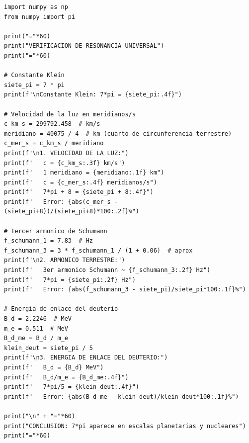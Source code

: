 \begin{lstlisting}[caption={Verificación de Resonancia Universal - Capítulo 12}]
import numpy as np
from numpy import pi

print("="*60)
print("VERIFICACION DE RESONANCIA UNIVERSAL")
print("="*60)

# Constante Klein
siete_pi = 7 * pi
print(f"\nConstante Klein: 7*pi = {siete_pi:.4f}")

# Velocidad de la luz en meridianos/s
c_km_s = 299792.458  # km/s
meridiano = 40075 / 4  # km (cuarto de circunferencia terrestre)
c_mer_s = c_km_s / meridiano
print(f"\n1. VELOCIDAD DE LA LUZ:")
print(f"   c = {c_km_s:.3f} km/s")
print(f"   1 meridiano = {meridiano:.1f} km")
print(f"   c = {c_mer_s:.4f} meridianos/s")
print(f"   7*pi + 8 = {siete_pi + 8:.4f}")
print(f"   Error: {abs(c_mer_s - (siete_pi+8))/(siete_pi+8)*100:.2f}%")

# Tercer armonico de Schumann
f_schumann_1 = 7.83  # Hz
f_schumann_3 = 3 * f_schumann_1 / (1 + 0.06)  # aprox
print(f"\n2. ARMONICO TERRESTRE:")
print(f"   3er armonico Schumann ~ {f_schumann_3:.2f} Hz")
print(f"   7*pi = {siete_pi:.2f} Hz")
print(f"   Error: {abs(f_schumann_3 - siete_pi)/siete_pi*100:.1f}%")

# Energia de enlace del deuterio
B_d = 2.2246  # MeV
m_e = 0.511  # MeV
B_d_me = B_d / m_e
klein_deut = siete_pi / 5
print(f"\n3. ENERGIA DE ENLACE DEL DEUTERIO:")
print(f"   B_d = {B_d} MeV")
print(f"   B_d/m_e = {B_d_me:.4f}")
print(f"   7*pi/5 = {klein_deut:.4f}")
print(f"   Error: {abs(B_d_me - klein_deut)/klein_deut*100:.1f}%")

print("\n" + "="*60)
print("CONCLUSION: 7*pi aparece en escalas planetarias y nucleares")
print("="*60)
\end{lstlisting}

